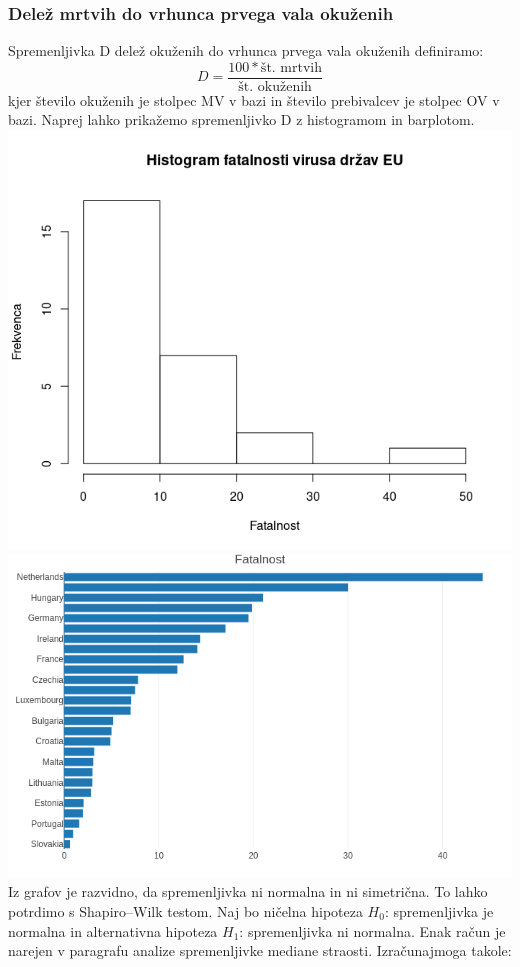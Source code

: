 \documentclass[a4paper,11pt]{article}
\begin{document}
\subsubsection{Delež mrtvih do vrhunca prvega vala okuženih}
Spremenljivka D delež okuženih do vrhunca prvega vala okuženih definiramo:
\[D = \frac{100 * \text{št. mrtvih}}{\text{št. okuženih}}\]
kjer število okuženih je stolpec MV v bazi in število prebivalcev je stolpec OV v bazi. Naprej lahko prikažemo spremenljivko D z histogramom in barplotom.
\includegraphics[scale=0.6]{histogram_fatalnost}
\includegraphics[scale=0.6]{barplot_fatalnost}
Iz grafov je razvidno, da spremenljivka ni normalna in ni simetrična. To lahko potrdimo s Shapiro–Wilk testom. Naj bo ničelna hipoteza \(H_0\): spremenljivka je normalna in alternativna hipoteza \(H_1\): spremenljivka ni normalna. Enak račun je narejen v paragrafu analize spremenljivke mediane straosti. Izračunajmoga takole:
\end{document}
